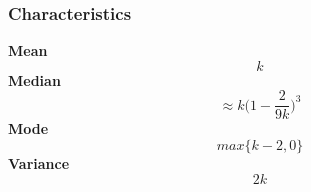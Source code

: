 \subsubsection*{Characteristics}
\smallskip \noindent \hspace{.2cm} \textbf{Mean} 
\begin{equation*}k\end{equation*}
\smallskip \noindent \hspace{.2cm} \textbf{Median} 
\begin{equation*}\approx k\bigg(1-\frac{2}{9k}\bigg)^3\end{equation*}
\smallskip \noindent \hspace{.2cm} \textbf{Mode} 
\begin{equation*}max\{k-2,0\}\end{equation*}
\smallskip \noindent \hspace{.2cm} \textbf{Variance} 
\begin{equation*}2k\end{equation*}
\smallskip
%
%
% 
%
%
%
%
%
